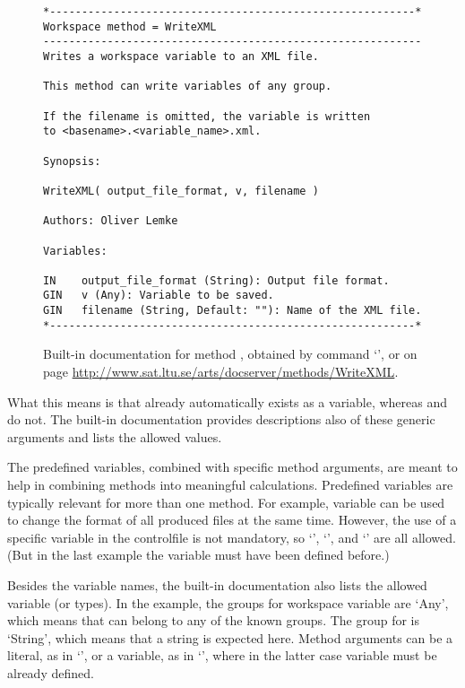 \begin{figure}
\footnotesize
\begin{lstlisting}
*---------------------------------------------------------*
Workspace method = WriteXML
-----------------------------------------------------------
Writes a workspace variable to an XML file.

This method can write variables of any group.

If the filename is omitted, the variable is written
to <basename>.<variable_name>.xml.

Synopsis:

WriteXML( output_file_format, v, filename )

Authors: Oliver Lemke

Variables:

IN    output_file_format (String): Output file format.
GIN   v (Any): Variable to be saved.
GIN   filename (String, Default: ""): Name of the XML file.
*---------------------------------------------------------*
\end{lstlisting}
\caption{Built-in documentation for method , obtained by
  command `', or on page
  \url{http://www.sat.ltu.se/arts/docserver/methods/WriteXML}.}
\label{fig:WriteXML}
\end{figure}

What this means is that  already automatically
exists as a variable, whereas  and 
do not. The built-in documentation provides descriptions also of these generic
arguments and lists the allowed values.

The predefined variables, combined with specific method arguments, are meant to
help in combining methods into meaningful calculations. Predefined variables
are typically relevant for more than one method. For example, variable
 can be used to change the format of all produced
files at the same time. However, the use of a specific variable in the
controlfile is not mandatory, so `', `', and
`' are all allowed. (But in the
last example the variable  must have been defined before.)

Besides the variable names, the built-in documentation also lists the allowed
variable  (or types). In the example, the groups for workspace variable
 are `Any', which means that  can belong to any of the
known groups. The group for  is `String', which means that a
string is expected here. Method arguments can be a literal, as in
`', or a variable, as in
`', where in the latter case variable
 must be already defined.

